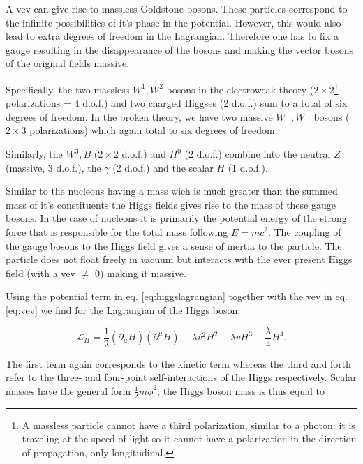 \begin{corollary}
A vev can give rise to massless Goldstone bosons. These particles correspond to the infinite possibilities of it's phase in the potential. However, this would also lead to extra degrees of freedom in the Lagrangian. Therefore one has to fix a gauge resulting in the disappearance of the bosons and making the vector bosons of the original fields massive. 

Specifically, the two massless $W^1, W^2$ bosons in the electroweak theory ($2 \times 2$\footnote{A massless particle cannot have a third polarization, similar to a photon: it is traveling at the speed of light so it cannot have a polarization in the direction of propagation, only longitudinal.} polarizations = 4 d.o.f.) and two charged Higgses (2 d.o.f.) sum to a total of six degrees of freedom. In the broken theory, we have two massive $W^+,W^-$ bosons ($2 \times 3$ polarizations) which again total to six degrees of freedom.

Similarly, the $W^3, B$ ($2\times2$ d.o.f.) and $H^0$ (2 d.o.f.) combine into the neutral $Z$ (massive, 3 d.o.f.), the $\gamma$ (2 d.o.f.) and the scalar $H$ (1 d.o.f.).

Similar to the nucleons having a mass wich is much greater than the summed mass of it's constituents the Higgs fields gives rise to the mass of these gauge bosons. In the case of nucleons it is primarily the potential energy of the strong force that is responsible for the total mass following $E=mc^2$. The coupling of the gauge bosons to the Higgs field gives a sense of inertia to the particle. The particle does not float freely in vacuum but interacts with the ever present Higgs field (with a vev $\neq$ 0) making it massive.
\end{corollary}

Using the potential term in eq. \ref{eq:higgslagrangian} together with the vev in eq. \ref{eq:vev} we find for the Lagrangian of the Higgs boson:

\begin{equation}
\mathcal{L}_H = \frac{1}{2}\left(\partial_\mu H\right)\left(\partial^\mu H\right) - \lambda v^2 H^2 - \lambda v H^3 - \frac{\lambda}{4}H^4.
\end{equation}

The first term again corresponds to the kinetic term whereas the third and forth refer to the three- and four-point self-interactions of the Higgs respectively. Scalar masses have the general form $\frac{1}{2}m\phi^2$; the Higgs boson mass is thus equal to 

